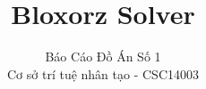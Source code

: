 \documentclass{reportDoCS2025}
\title{Bloxorz Solver}
\subtitle{Báo Cáo Đồ Án Số 1 \\ Cơ sở trí tuệ nhân tạo - CSC14003}
\begin{document}
\cover
\numRoman

% 



\contents

% 

\pageNumber









% 




\listTables
\listImages
\end{document}
